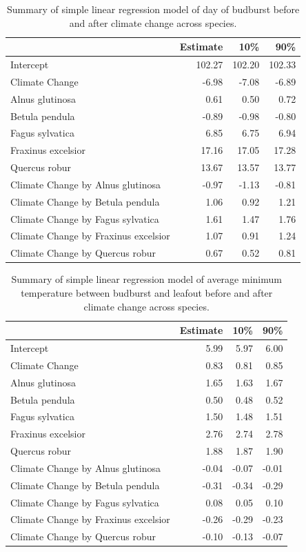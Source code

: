 \documentclass{article}\usepackage[]{graphicx}\usepackage[]{color}
\begin{document}
\begin{table}[H]
\centering
\caption{Summary of simple linear regression model of day of budburst before and after climate change across species.} 
\begin{tabular}{lrrr}
  \hline
 & Estimate & 10\% & 90\% \\ 
  \hline
Intercept & 102.27 & 102.20 & 102.33 \\ 
  Climate Change & -6.98 & -7.08 & -6.89 \\ 
  Alnus glutinosa & 0.61 & 0.50 & 0.72 \\ 
  Betula pendula & -0.89 & -0.98 & -0.80 \\ 
  Fagus sylvatica & 6.85 & 6.75 & 6.94 \\ 
  Fraxinus excelsior & 17.16 & 17.05 & 17.28 \\ 
  Quercus robur & 13.67 & 13.57 & 13.77 \\ 
  Climate Change by Alnus glutinosa & -0.97 & -1.13 & -0.81 \\ 
  Climate Change by Betula pendula & 1.06 & 0.92 & 1.21 \\ 
  Climate Change by Fagus sylvatica & 1.61 & 1.47 & 1.76 \\ 
  Climate Change by Fraxinus excelsior & 1.07 & 0.91 & 1.24 \\ 
  Climate Change by Quercus robur & 0.67 & 0.52 & 0.81 \\ 
   \hline
\end{tabular}
\end{table}
\begin{table}[H]
\centering
\caption{Summary of simple linear regression model of average minimum temperature between budburst and leafout before and after climate change across species.} 
\begin{tabular}{lrrr}
  \hline
 & Estimate & 10\% & 90\% \\ 
  \hline
Intercept & 5.99 & 5.97 & 6.00 \\ 
  Climate Change & 0.83 & 0.81 & 0.85 \\ 
  Alnus glutinosa & 1.65 & 1.63 & 1.67 \\ 
  Betula pendula & 0.50 & 0.48 & 0.52 \\ 
  Fagus sylvatica & 1.50 & 1.48 & 1.51 \\ 
  Fraxinus excelsior & 2.76 & 2.74 & 2.78 \\ 
  Quercus robur & 1.88 & 1.87 & 1.90 \\ 
  Climate Change by Alnus glutinosa & -0.04 & -0.07 & -0.01 \\ 
  Climate Change by Betula pendula & -0.31 & -0.34 & -0.29 \\ 
  Climate Change by Fagus sylvatica & 0.08 & 0.05 & 0.10 \\ 
  Climate Change by Fraxinus excelsior & -0.26 & -0.29 & -0.23 \\ 
  Climate Change by Quercus robur & -0.10 & -0.13 & -0.07 \\ 
   \hline
\end{tabular}
\end{table}
\end{document}

